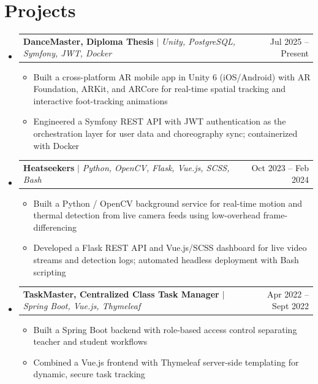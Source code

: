 \documentclass[letterpaper,11pt]{article}
\makeatletter
\newcommand{\resumeItem}[1]{
  \item\small{
    {#1 \vspace{-2pt}}
  }
}
\newcommand{\resumeProjectHeading}[2]{
    \item
    \begin{tabular*}{0.97\textwidth}{l@{\extracolsep{\fill}}r}
      \small#1 & #2 \\
    \end{tabular*}\vspace{-7pt}
}
\newcommand{\resumeSubHeadingListStart}{\begin{itemize}[leftmargin=0.15in, label={}]}
\newcommand{\resumeSubHeadingListEnd}{\end{itemize}}
\newcommand{\resumeItemListStart}{\begin{itemize}}
\newcommand{\resumeItemListEnd}{\end{itemize}\vspace{-5pt}}
\makeatother
\begin{document}
\section{Projects}
    \resumeSubHeadingListStart
      \resumeProjectHeading
          {\textbf{DanceMaster, Diploma Thesis} $|$ \emph{Unity, PostgreSQL, Symfony, JWT, Docker}}{Jul 2025 -- Present}
          \resumeItemListStart
            \resumeItem{Built a cross-platform AR mobile app in Unity 6 (iOS/Android) with AR Foundation, ARKit, and ARCore for real-time spatial tracking and interactive foot-tracking animations}
            \resumeItem{Engineered a Symfony REST API with JWT authentication as the orchestration layer for user data and choreography sync; containerized with Docker}
          \resumeItemListEnd
      \resumeProjectHeading
          {\textbf{Heatseekers} $|$ \emph{Python, OpenCV, Flask, Vue.js, SCSS, Bash}}{Oct 2023 -- Feb 2024}
          \resumeItemListStart
            \resumeItem{Built a Python / OpenCV background service for real-time motion and thermal detection from live camera feeds using low-overhead frame-differencing}
            \resumeItem{Developed a Flask REST API and Vue.js/SCSS dashboard for live video streams and detection logs; automated headless deployment with Bash scripting}
          \resumeItemListEnd
      \resumeProjectHeading
          {\textbf{TaskMaster, Centralized Class Task Manager} $|$ \emph{Spring Boot, Vue.js, Thymeleaf}}{Apr 2022 -- Sept 2022}
          \resumeItemListStart
            \resumeItem{Built a Spring Boot backend with role-based access control separating teacher and student workflows}
            \resumeItem{Combined a Vue.js frontend with Thymeleaf server-side templating for dynamic, secure task tracking}
          \resumeItemListEnd
    \resumeSubHeadingListEnd


\end{document}
